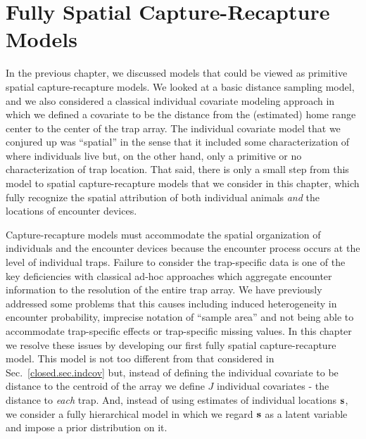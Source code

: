 




\chapter{Fully Spatial Capture-Recapture Models}
\label{chapt.scr0}

\vspace{.3in}

In the previous chapter, we discussed models that could be viewed as
primitive spatial capture-recapture models. We looked at a basic
distance sampling model, and we also considered a classical individual
covariate modeling approach in which we defined a covariate to be the
distance from the (estimated) home range center to the center of the
trap array. The individual covariate model that we conjured up
was ``spatial'' in the sense that it included some
characterization of where individuals live but, on the other hand,
only a primitive or no characterization of trap location.  That said,
there is only a small step from this model to spatial
capture-recapture models that we consider in this chapter, which fully
recognize the spatial attribution of both individual animals {\it and}
the locations of encounter devices.

Capture-recapture models must accommodate the spatial organization of
individuals and the encounter devices because the encounter process
occurs at the level of individual traps.  Failure to consider the
trap-specific data is one of the key deficiencies with classical ad-hoc
approaches which aggregate encounter information to the resolution of
the entire trap array. We have previously addressed some problems that
this causes including induced heterogeneity in encounter probability,
imprecise notation of ``sample area'' and not being able to
accommodate trap-specific effects or trap-specific missing values.  In
this chapter we resolve these issues by developing our first fully
spatial capture-recapture model. This model is not too different from
that considered in Sec.~\ref{closed.sec.indcov} but, instead of
defining the individual covariate to be distance to the centroid of
the array we define $J$ individual covariates - the distance to {\it
  each} trap. And, instead of using estimates of individual locations
${\bf s}$, we consider a fully hierarchical model in which we regard
${\bf s}$ as a latent variable and impose a prior distribution on it.

